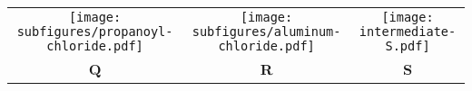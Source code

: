 \documentclass{article}
\begin{document}
	\begin{tabular}{ccc}
		\texttt{[image: subfigures/propanoyl-chloride.pdf]} & \texttt{[image: subfigures/aluminum-chloride.pdf]} & \texttt{[image: intermediate-S.pdf]} \\
		\textbf{Q} & \textbf{R} & \textbf{S}
	\end{tabular}
\end{document}
